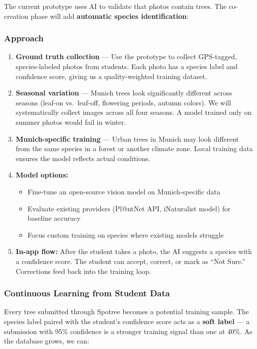 \documentclass[11pt,a4paper]{article}
\begin{document}
The current prototype uses AI to validate that photos contain trees. The co-creation phase will add \textbf{automatic species identification}:

\subsubsection{Approach}
\begin{enumerate}
  \item \textbf{Ground truth collection} --- Use the prototype to collect GPS-tagged, species-labeled photos from students. Each photo has a species label and confidence score, giving us a quality-weighted training dataset.
  \item \textbf{Seasonal variation} --- Munich trees look significantly different across seasons (leaf-on vs.\ leaf-off, flowering periods, autumn colors). We will systematically collect images across all four seasons. A model trained only on summer photos would fail in winter.
  \item \textbf{Munich-specific training} --- Urban trees in Munich may look different from the same species in a forest or another climate zone. Local training data ensures the model reflects actual conditions.
  \item \textbf{Model options:}
  \begin{itemize}
    \item Fine-tune an open-source vision model on Munich-specific data
    \item Evaluate existing providers (Pl@ntNet API, iNaturalist model) for baseline accuracy
    \item Focus custom training on species where existing models struggle
  \end{itemize}
  \item \textbf{In-app flow:} After the student takes a photo, the AI suggests a species with a confidence score. The student can accept, correct, or mark as ``Not Sure.'' Corrections feed back into the training loop.
\end{enumerate}

\subsubsection{Continuous Learning from Student Data}

Every tree submitted through Spotree becomes a potential training sample. The species label paired with the student's confidence score acts as a \textbf{soft label} --- a submission with 95\% confidence is a stronger training signal than one at 40\%. As the database grows, we can:
\end{document}
